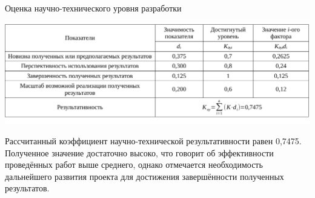 \begin{table}[!ht]
\caption{Оценка научно-технического уровня разработки}
\centering
\includegraphics[page=1, width=1\linewidth]{tables/economics/econom_5.pdf}
\label{tab:eco_10}
\end{table}

Рассчитанный коэффициент научно-технической результативности равен 0,7475. Полученное значение достаточно высоко, что говорит об эффективности проведённых работ выше среднего, однако отмечается необходимость дальнейшего развития проекта для достижения завершённости полученных результатов.


\clearpage